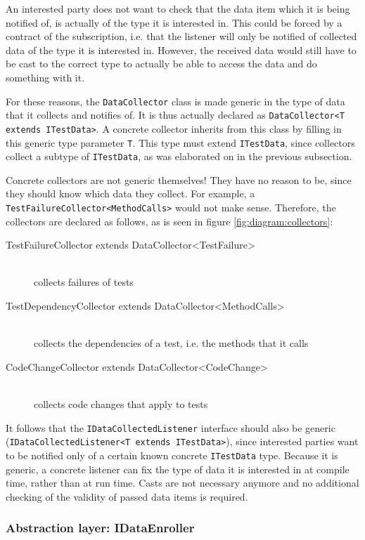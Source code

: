 \documentclass[i2]{oss}
\newcommand{\class}[1]{\texttt{#1}}
\begin{document}
An interested party does not want to check that the data item which it is being notified of, is actually of the type it is interested in.
This could be forced by a contract of the subscription, i.e. that the listener will only be notified of collected data of the type it is interested in.
However, the received data would still have to be cast to the correct type to actually be able to access the data and do something with it.

For these reasons, the \class{DataCollector} class is made generic in the type of data that it collects and notifies of.
It is thus actually declared as \class{DataCollector<T extends ITestData>}.
A concrete collector inherits from this class by filling in this generic type parameter \class{T}.
This type must extend \class{ITestData}, since collectors collect a subtype of \class{ITestData}, as was elaborated on in the previous subsection.

Concrete collectors are not generic themselves!
They have no reason to be, since they should know which data they collect.
For example, a \class{TestFailureCollector<MethodCalls>} would not make sense.
Therefore, the collectors are declared as follows, as is seen in figure \ref{fig:diagram:collectors}:
\begin{description}
\item[TestFailureCollector extends DataCollector<TestFailure>] \hfill \\ collects failures of tests
\item[TestDependencyCollector extends DataCollector<MethodCalls>] \hfill \\ collects the dependencies of a test, i.e. the methods that it calls
\item[CodeChangeCollector extends DataCollector<CodeChange>] \hfill \\ collects code changes that apply to tests
\end{description}

It follows that the \class{IDataCollectedListener} interface should also be generic (\class{IDataCollectedListener<T extends ITestData>}), since interested parties want to be notified only of a certain known concrete \class{ITestData} type.
Because it is generic, a concrete listener can fix the type of data it is interested in at compile time, rather than at run time. Casts are not necessary anymore and no additional checking of the validity of passed data items is required.

\subsubsection{Abstraction layer: IDataEnroller}
\end{document}
